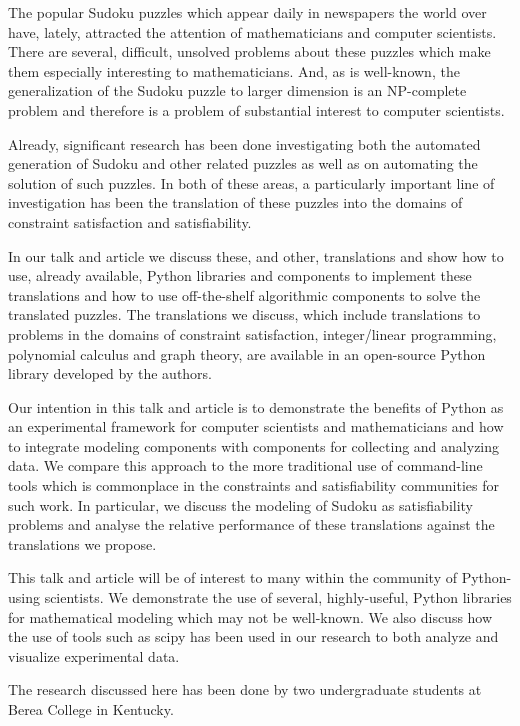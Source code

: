 The popular Sudoku puzzles which appear daily in newspapers the world over have, lately, attracted the attention of mathematicians and computer scientists. There are several, difficult, unsolved problems about these puzzles which make them especially interesting to mathematicians. And, as is well-known, the generalization of the Sudoku puzzle to larger dimension is an NP-complete problem and therefore is a problem of substantial interest to computer scientists.

Already, significant research has been done investigating both the automated generation of Sudoku and other related puzzles as well as on automating the solution of such puzzles. In both of these areas, a particularly important line of investigation has been the translation of these puzzles into the domains of constraint satisfaction and satisfiability.

In our talk and article we discuss these, and other, translations and show how to use, already available, Python libraries and components to implement these translations and how to use off-the-shelf algorithmic components to solve the translated puzzles. The translations we discuss, which include translations to problems in the domains of constraint satisfaction, integer/linear programming, polynomial calculus and graph theory, are available in an open-source Python library developed by the authors.

Our intention in this talk and article is to demonstrate the benefits of Python as an experimental framework for computer scientists and mathematicians and how to integrate modeling components with components for collecting and analyzing data. We compare this approach to the more traditional use of command-line tools which is commonplace in the constraints and satisfiability communities for such work. In particular, we discuss the modeling of Sudoku as satisfiability problems and analyse the relative performance of these translations against the translations we propose.

This talk and article will be of interest to many within the community of Python-using scientists. We demonstrate the use of several, highly-useful, Python libraries for mathematical modeling which may not be well-known. We also discuss how the use of tools such as scipy has been used in our research to both analyze and visualize experimental data.

The research discussed here has been done by two undergraduate students at Berea College in Kentucky.

